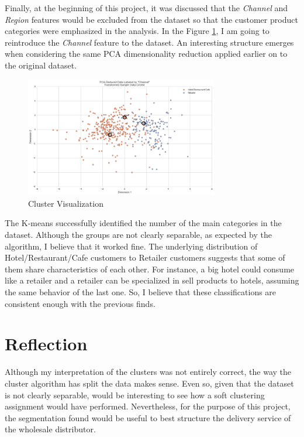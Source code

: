 \documentclass[a4paper]{article}
\begin{document}
Finally, at the beginning of this project, it was discussed that the \textit{Channel} and \textit{Region} features would be excluded from the dataset so that the customer product categories were emphasized in the analysis. In the Figure \ref{fig:clustering_2}, I am going to reintroduce the \textit{Channel} feature to the dataset. An interesting structure emerges when considering the same PCA dimensionality reduction applied earlier on to the original dataset.

\begin{figure}[ht!]
\centering
\includegraphics[width=0.75\textwidth]{figures/clustering_2.png}
\caption{\label{fig:clustering_2}Cluster Visualization}
\end{figure}

The K-means successfully identified the number of the main categories in the dataset. Although the groups are not clearly separable, as expected by the algorithm, I believe that it worked fine. The underlying distribution of Hotel/Restaurant/Cafe customers to Retailer customers suggests that some of them share characteristics of each other. For instance, a big hotel could consume like a retailer and a retailer can be specialized in sell products to hotels, assuming the same behavior of the last one. So, I believe that these classifications are consistent enough with the previous finds.


\section{Reflection}
\label{sec:reflection}
Although my interpretation of the clusters was not entirely correct, the way the cluster algorithm has split the data makes sense. Even so, given that the dataset is not clearly separable, would be interesting to see how a soft clustering assignment would have performed. Nevertheless, for the purpose of this project, the segmentation found would be useful to best structure the delivery service of the wholesale distributor.






\end{document}
